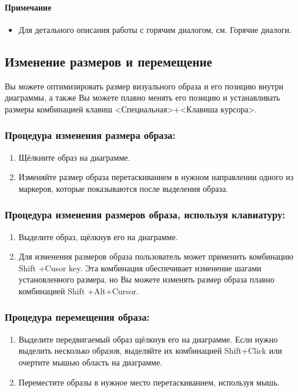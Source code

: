 \documentclass[a4paper,12pt]{report}
\begin{document}
\paragraph{Примечание}
\begin{itemize}
	\item Для детального описания работы с горячим диалогом, см. Горячие диалоги.
	
\end{itemize}

\subsection*{Изменение размеров и перемещение}
Вы можете оптимизировать размер визуального образа и его позицию внутри диаграммы, а
также Вы можете плавно менять его позицию и устанавливать размеры комбинацией клавиш
<Специальная>+<Клавиша курсора>.

\subsubsection*{Процедура изменения размера образа:}
\begin{enumerate}
	\item  Щёлкните образ на диаграмме.
	\item Изменяйте размер образа перетаскиванием в нужном направлении одного из маркеров, которые показываются после выделения образа.
\end{enumerate}

\subsubsection*{Процедура изменения размеров образа, используя клавиатуру:}
\begin{enumerate}
	\item Выделите образ, щёлкнув его на диаграмме.
	\item Для изменения размеров образа пользователь может применить комбинацию Shift +Cusor
	key. Эта комбинация обеспечивает изменение шагами установленного размера, но Вы
	можете изменять размер образа плавно комбинацией Shift +Alt+Cursor.
\end{enumerate}

\subsubsection*{Процедура перемещения образа:}
\begin{enumerate}
	\item Выделите передвигаемый образ щёлкнув его на диаграмме. Если нужно выделить несколько
	образов, выделяйте их комбинацией Shift+Click или очертите мышью область на диаграмме.
	\item Переместите образы в нужное место перетаскиванием, используя мышь.
\end{enumerate}
\end{document}
